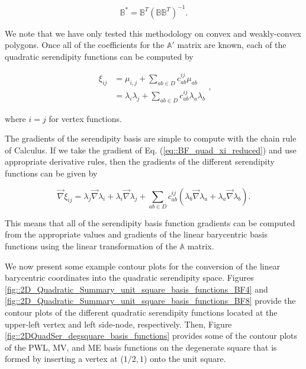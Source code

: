 \begin{equation}
\label{eq::BF_quad_MP_inverse}
\mathbb{B}^* = \mathbb{B}^T (\mathbb{B} \mathbb{B}^T)^{-1}.
\end{equation}

\noindent We note that we have only tested this methodology on convex and weakly-convex polygons. Once all of the coefficients for the $\mathbb{A}'$ matrix are known, each of the quadratic serendipity functions can be computed by

\begin{equation}
\label{eq::BF_quad_xi_reduced}
\begin{aligned}
\xi_{ij} &=  \mu_{i,j} + \sum_{ab \in D} c_{ab}^{ij} \mu_{ab} \\
&=  \lambda_i \lambda_j + \sum_{ab \in D} c_{ab}^{ij}\lambda_a \lambda_b
\end{aligned} ,
\end{equation}

\noindent where $i=j$ for vertex functions.

The gradients of the serendipity basis are simple to compute with the chain rule of Calculus. If we take the gradient of Eq. (\ref{eq::BF_quad_xi_reduced}) and use appropriate derivative rules, then the gradients of the different serendipity functions can be given by

\begin{equation}
\label{eq::BF_ser_gradient}
\vec{\nabla} \xi_{ij} = \lambda_j \vec{\nabla} \lambda_i + \lambda_i \vec{\nabla} \lambda_j + \sum_{ab \in D} c_{ab}^{ij} \left(  \lambda_b \vec{\nabla} \lambda_a + \lambda_a \vec{\nabla} \lambda_b \right) .
\end{equation}

\noindent This means that all of the serendipity basis function gradients can be computed from the appropriate values and gradients of the linear barycentric basis functions using the linear transformation of the $\mathbb{A}$ matrix.

We now present some example contour plots for the conversion of the linear barycentric coordinates into the quadratic serendipity space. Figures \ref{fig::2D_Quadratic_Summary_unit_square_basis_functions_BF4} and \ref{fig::2D_Quadratic_Summary_unit_square_basis_functions_BF8} provide the contour plots of the different quadratic serendipity functions located at the upper-left vertex and left side-node, respectively. Then, Figure \ref{fig::2DQuadSer_degsquare_basis_functions} provides some of the contour plots of the PWL, MV, and ME basis functions on the degenerate square that is formed by inserting a vertex at ($1/2,1$) onto the unit square.

